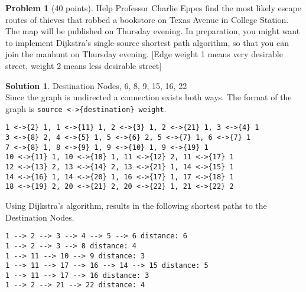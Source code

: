 \documentclass{article}
\theoremstyle{definition}
\newtheorem{problem}{Problem}
\newtheorem*{solution}{Solution}
\begin{document}
\clearpage
\begin{problem}[40 points]
  Help Professor Charlie Eppes find the most likely escape routes of
  thieves that robbed a bookstore on Texas Avenue in College
  Station. The map will be published on Thursday evening. In preparation, you
  might want to implement Dijkstra's single-source shortest path
  algorithm, so that you can join the manhunt on Thursday
  evening. [Edge weight 1 means very desirable street, weight 2 means
  less desirable street] 
\end{problem}
\begin{solution}
Destination Nodes, 6, 8, 9, 15, 16, 22\\
Since the graph is undirected a connection exists both ways.
The format of the graph is \verb+source <->{destination} weight+.\\
\begin{verbatim}
1 <->{2} 1, 1 <->{11} 1, 2 <->{3} 1, 2 <->{21} 1, 3 <->{4} 1
3 <->{8} 2, 4 <->{5} 1, 5 <->{6} 2, 5 <->{7} 1, 6 <->{7} 1
7 <->{8} 1, 8 <->{9} 1, 9 <->{10} 1, 9 <->{19} 1
10 <->{11} 1, 10 <->{18} 1, 11 <->{12} 2, 11 <->{17} 1
12 <->{13} 2, 13 <->{14} 2, 13 <->{21} 1, 14 <->{15} 1
14 <->{16} 1, 14 <->{20} 1, 16 <->{17} 1, 17 <->{18} 1
18 <->{19} 2, 20 <->{21} 2, 20 <->{22} 1, 21 <->{22} 2
\end{verbatim}

\noindent
Using Dijkstra's algorithm, results in the following shortest paths to the Destination Nodes.
\begin{verbatim}
1 --> 2 --> 3 --> 4 --> 5 --> 6 distance: 6
1 --> 2 --> 3 --> 8 distance: 4
1 --> 11 --> 10 --> 9 distance: 3
1 --> 11 --> 17 --> 16 --> 14 --> 15 distance: 5
1 --> 11 --> 17 --> 16 distance: 3
1 --> 2 --> 21 --> 22 distance: 4
\end{verbatim}
\end{solution}
\end{document}

